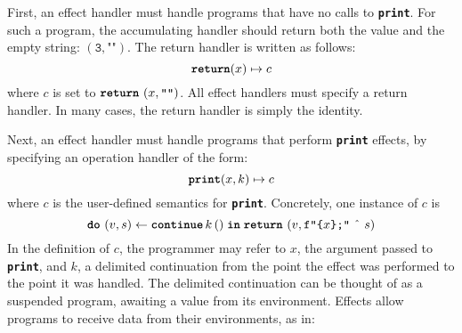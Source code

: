 First, an effect handler must handle programs that have no calls to \textbf{\texttt{print}}. For such a program, the accumulating handler should return both the value and the empty string: $(\texttt{3}, \texttt{""})$. The return handler is written as follows:
\[\textbf{\texttt{return}}(x) \mapsto {c}\]
where $c$ is set to $\texttt{\textbf{return}} \,\, {(x, \texttt{""})}$. All effect handlers must specify a return handler. In many cases, the return handler is simply the identity. 

Next, an effect handler must handle programs that perform \textbf{\texttt{print}} effects, by specifying an operation handler of the form:
\[\textbf{\texttt{print}}(x, k) \mapsto {c}\]
where $c$ is the user-defined semantics for \textbf{\texttt{print}}.
Concretely, one instance of $c$ is 
\[{\texttt{\textbf{do}} \,\, {(v, s)} \leftarrow {\textbf{\texttt{continue}} \, {k} \, {()}} \; \textbf{\texttt{in}} \; {\texttt{\textbf{return}} \,\, {(v, \texttt{f"\{$x$\};"} \text{ \^\ } s)}}}\]
In the definition of $c$, the programmer may refer to $x$, the argument passed to \textbf{\texttt{print}}, and $k$, a delimited continuation from the point the effect was performed to the point it was handled. The delimited continuation can be thought of as a suspended program, awaiting a value from its environment. Effects allow programs to receive data from their environments, as in:
